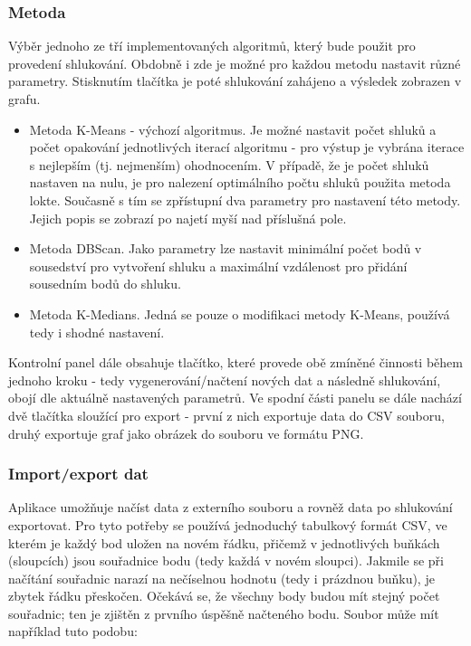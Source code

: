 \documentclass[pdftex,a4paper]{article}
\begin{document}
\subsubsection*{Metoda}
Výběr jednoho ze tří implementovaných algoritmů, který bude použit pro provedení shlukování. Obdobně i zde je možné pro každou metodu nastavit různé parametry. Stisknutím tlačítka je poté shlukování zahájeno a výsledek zobrazen v grafu.

\begin{itemize}
	\item Metoda K-Means - výchozí algoritmus. Je možné nastavit počet shluků a počet opakování jednotlivých iterací algoritmu - pro výstup je vybrána iterace s nejlepším (tj. nejmenším) ohodnocením. V případě, že je počet shluků nastaven na nulu, je pro nalezení optimálního počtu shluků použita metoda lokte. Současně s tím se zpřístupní dva parametry pro nastavení této metody. Jejich popis se zobrazí po najetí myší nad příslušná pole.
	
	\item Metoda DBScan. Jako parametry lze nastavit minimální počet bodů v sousedství pro vytvoření shluku a maximální vzdálenost pro přidání sousedním bodů do shluku.
	
	\item Metoda K-Medians. Jedná se pouze o modifikaci metody K-Means, používá tedy i shodné nastavení.
\end{itemize}

Kontrolní panel dále obsahuje tlačítko, které provede obě zmíněné činnosti během jednoho kroku - tedy vygenerování/načtení nových dat a následně shlukování, obojí dle aktuálně nastavených parametrů. Ve spodní části panelu se dále nachází dvě tlačítka sloužící pro export - první z nich exportuje data do CSV souboru, druhý exportuje graf jako obrázek do souboru ve formátu PNG.


\subsubsection*{Import/export dat}
Aplikace umožňuje načíst data z externího souboru a rovněž data po shlukování exportovat. Pro tyto potřeby se používá jednoduchý tabulkový formát CSV, ve kterém je každý bod uložen na novém řádku, přičemž v jednotlivých buňkách (sloupcích) jsou souřadnice bodu (tedy každá  v novém sloupci). Jakmile se při načítání souřadnic narazí na nečíselnou hodnotu (tedy i prázdnou buňku), je zbytek řádku přeskočen. Očekává se, že všechny body budou mít stejný počet souřadnic; ten je zjištěn z prvního úspěšně načteného bodu. Soubor může mít například tuto podobu:
\end{document}
